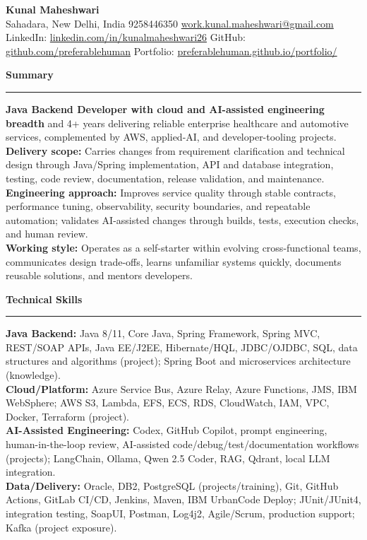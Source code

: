 \documentclass[11pt,letterpaper]{article}
\newcommand{\ressection}[1]{\Needspace{6\baselineskip}\vspace{8pt}\par\textbf{#1}\par\vspace{2pt}\hrule\vspace{5pt}}
\begin{document}
\pagestyle{empty}\raggedright\fontsize{11}{12.5}\selectfont

{\Large \textbf{Kunal Maheshwari}}\\
Sahadara, New Delhi, India \textbar{} 9258446350 \textbar{} \href{mailto:work.kunal.maheshwari@gmail.com}{work.kunal.maheshwari@gmail.com}\\
LinkedIn: \href{https://www.linkedin.com/in/kunalmaheshwari26}{linkedin.com/in/kunalmaheshwari26} \textbar{} GitHub: \href{https://github.com/preferablehuman}{github.com/preferablehuman} \textbar{} Portfolio: \href{https://preferablehuman.github.io/portfolio/}{preferablehuman.github.io/portfolio/}

\ressection{Summary}
\textbf{Java Backend Developer with cloud and AI-assisted engineering breadth} and 4+ years delivering reliable enterprise healthcare and automotive services, complemented by AWS, applied-AI, and developer-tooling projects.\\[2pt]
\textbf{Delivery scope:} Carries changes from requirement clarification and technical design through Java/Spring implementation, API and database integration, testing, code review, documentation, release validation, and maintenance.\\[2pt]
\textbf{Engineering approach:} Improves service quality through stable contracts, performance tuning, observability, security boundaries, and repeatable automation; validates AI-assisted changes through builds, tests, execution checks, and human review.\\[2pt]
\textbf{Working style:} Operates as a self-starter within evolving cross-functional teams, communicates design trade-offs, learns unfamiliar systems quickly, documents reusable solutions, and mentors developers.

\ressection{Technical Skills}
\textbf{Java Backend:} Java 8/11, Core Java, Spring Framework, Spring MVC, REST/SOAP APIs, Java EE/J2EE, Hibernate/HQL, JDBC/OJDBC, SQL, data structures and algorithms (project); Spring Boot and microservices architecture (knowledge).\\
\textbf{Cloud/Platform:} Azure Service Bus, Azure Relay, Azure Functions, JMS, IBM WebSphere; AWS S3, Lambda, EFS, ECS, RDS, CloudWatch, IAM, VPC, Docker, Terraform (project).\\
\textbf{AI-Assisted Engineering:} Codex, GitHub Copilot, prompt engineering, human-in-the-loop review, AI-assisted code/debug/test/documentation workflows (projects); LangChain, Ollama, Qwen 2.5 Coder, RAG, Qdrant, local LLM integration.\\
\textbf{Data/Delivery:} Oracle, DB2, PostgreSQL (projects/training), Git, GitHub Actions, GitLab CI/CD, Jenkins, Maven, IBM UrbanCode Deploy; JUnit/JUnit4, integration testing, SoapUI, Postman, Log4j2, Agile/Scrum, production support; Kafka (project exposure).
\end{document}
